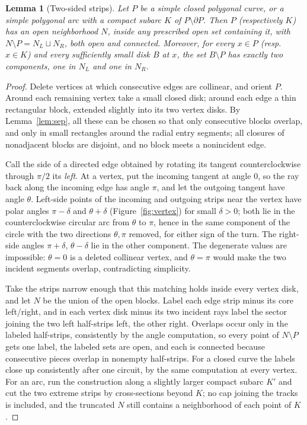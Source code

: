 \documentclass[11pt,a4paper]{article}
\theoremstyle{jsplain}
\newtheorem{lemma}[theorem]{Lemma}
\theoremstyle{jsdefn}
\begin{document}
\begin{lemma}[Two-sided strips]\label{lem:strip}
Let $P$ be a simple closed polygonal curve, or a simple polygonal arc
with a compact subarc $K$ of $P\setminus\partial P$. Then $P$
(respectively $K$) has an open neighborhood $N$, inside any prescribed
open set containing it, with
$N\setminus P=N_L\sqcup N_R$, both open and connected. Moreover, for
every $x\in P$ (resp.\ $x\in K$) and every sufficiently small disk $B$
at $x$, the set $B\setminus P$ has exactly two components, one in
$N_L$ and one in $N_R$.
\end{lemma}
\begin{proof}
Delete vertices at which consecutive edges are collinear, and orient
$P$. Around each remaining vertex take a small closed disk; around
each edge a thin rectangular block, extended slightly into its two
vertex disks. By Lemma~\ref{lem:sep}, all these can be chosen so that
only consecutive blocks overlap, and only in small rectangles around
the radial entry segments; all closures of nonadjacent blocks are
disjoint, and no block meets a nonincident edge.

Call the side of a directed edge obtained by rotating its tangent
counterclockwise through $\pi/2$ its \emph{left}. At a vertex, put the
incoming tangent at angle $0$, so the ray back along the incoming edge
has angle $\pi$, and let the outgoing tangent have angle $\theta$.
Left-side points of the incoming and outgoing strips near the vertex
have polar angles $\pi-\delta$ and $\theta+\delta$ (Figure~\ref{fig:vertex}) for small
$\delta>0$; both lie in the counterclockwise circular arc from
$\theta$ to $\pi$, hence in the same component of the circle with the
two directions $\theta,\pi$ removed, for either sign of the turn. The
right-side angles $\pi+\delta$, $\theta-\delta$ lie in the other
component. The degenerate values are impossible: $\theta=0$ is a
deleted collinear vertex, and $\theta=\pi$ would make the two incident
segments overlap, contradicting simplicity.

Take the strips narrow enough that this matching holds inside every
vertex disk, and let $N$ be the union of the open blocks. Label each
edge strip minus its core left/right, and in each vertex disk minus
its two incident rays label the sector joining the two left
half-strips left, the other right. Overlaps occur only in the labeled
half-strips, consistently by the angle computation, so every point of
$N\setminus P$ gets one label, the labeled sets are open, and each is
connected because consecutive pieces overlap in nonempty half-strips.
For a closed curve the labels close up consistently after one
circuit, by the same computation at every vertex. For an arc, run the
construction along a slightly larger compact subarc $K'$ and cut the
two extreme strips by cross-sections beyond $K$; no cap joining the
tracks is included, and the truncated $N$ still contains a
neighborhood of each point of $K$.


\end{proof}
\end{document}
